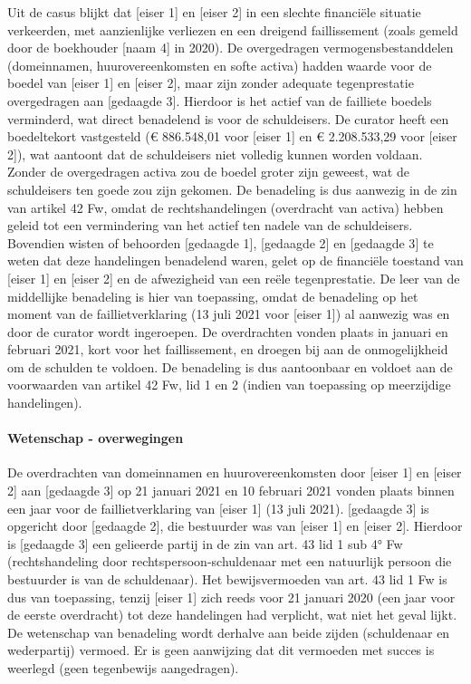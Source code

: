 \documentclass[
  dutch,
  a4paper,
]{article}
\begin{document}
Uit de casus blijkt dat {[}eiser 1{]} en {[}eiser 2{]} in een slechte financiële situatie verkeerden, met aanzienlijke verliezen en een dreigend faillissement (zoals gemeld door de boekhouder {[}naam 4{]} in 2020). De overgedragen vermogensbestanddelen (domeinnamen, huurovereenkomsten en softe activa) hadden waarde voor de boedel van {[}eiser 1{]} en {[}eiser 2{]}, maar zijn zonder adequate tegenprestatie overgedragen aan {[}gedaagde 3{]}. Hierdoor is het actief van de failliete boedels verminderd, wat direct benadelend is voor de schuldeisers. De curator heeft een boedeltekort vastgesteld (€ 886.548,01 voor {[}eiser 1{]} en € 2.208.533,29 voor {[}eiser 2{]}), wat aantoont dat de schuldeisers niet volledig kunnen worden voldaan. Zonder de overgedragen activa zou de boedel groter zijn geweest, wat de schuldeisers ten goede zou zijn gekomen. De benadeling is dus aanwezig in de zin van artikel 42 Fw, omdat de rechtshandelingen (overdracht van activa) hebben geleid tot een vermindering van het actief ten nadele van de schuldeisers. Bovendien wisten of behoorden {[}gedaagde 1{]}, {[}gedaagde 2{]} en {[}gedaagde 3{]} te weten dat deze handelingen benadelend waren, gelet op de financiële toestand van {[}eiser 1{]} en {[}eiser 2{]} en de afwezigheid van een reële tegenprestatie. De leer van de middellijke benadeling is hier van toepassing, omdat de benadeling op het moment van de faillietverklaring (13 juli 2021 voor {[}eiser 1{]}) al aanwezig was en door de curator wordt ingeroepen. De overdrachten vonden plaats in januari en februari 2021, kort voor het faillissement, en droegen bij aan de onmogelijkheid om de schulden te voldoen. De benadeling is dus aantoonbaar en voldoet aan de voorwaarden van artikel 42 Fw, lid 1 en 2 (indien van toepassing op meerzijdige handelingen).

\paragraph{Wetenschap - overwegingen}\label{wetenschap---overwegingen-18}

De overdrachten van domeinnamen en huurovereenkomsten door {[}eiser 1{]} en {[}eiser 2{]} aan {[}gedaagde 3{]} op 21 januari 2021 en 10 februari 2021 vonden plaats binnen een jaar voor de faillietverklaring van {[}eiser 1{]} (13 juli 2021). {[}gedaagde 3{]} is opgericht door {[}gedaagde 2{]}, die bestuurder was van {[}eiser 1{]} en {[}eiser 2{]}. Hierdoor is {[}gedaagde 3{]} een gelieerde partij in de zin van art. 43 lid 1 sub 4° Fw (rechtshandeling door rechtspersoon-schuldenaar met een natuurlijk persoon die bestuurder is van de schuldenaar). Het bewijsvermoeden van art. 43 lid 1 Fw is dus van toepassing, tenzij {[}eiser 1{]} zich reeds voor 21 januari 2020 (een jaar voor de eerste overdracht) tot deze handelingen had verplicht, wat niet het geval lijkt. De wetenschap van benadeling wordt derhalve aan beide zijden (schuldenaar en wederpartij) vermoed. Er is geen aanwijzing dat dit vermoeden met succes is weerlegd (geen tegenbewijs aangedragen).
\end{document}
